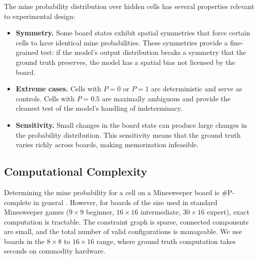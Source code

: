 \documentclass[12pt,a4paper]{article}
\begin{document}
The mine probability distribution over hidden cells has several properties relevant to experimental design:

\begin{itemize}[nosep]
    \item \textbf{Symmetry.} Some board states exhibit spatial symmetries that force certain cells to have identical mine probabilities. These symmetries provide a fine-grained test: if the model's output distribution breaks a symmetry that the ground truth preserves, the model has a spatial bias not licensed by the board.
    \item \textbf{Extreme cases.} Cells with $P = 0$ or $P = 1$ are deterministic and serve as controls. Cells with $P = 0.5$ are maximally ambiguous and provide the cleanest test of the model's handling of indeterminacy.
    \item \textbf{Sensitivity.} Small changes in the board state can produce large changes in the probability distribution. This sensitivity means that the ground truth varies richly across boards, making memorization infeasible.
\end{itemize}

\subsection{Computational Complexity}
\label{sec:complexity}

Determining the mine probability for a cell on a Minesweeper board is \#P-complete in general \citep{kaye2000}. However, for boards of the size used in standard Minesweeper games ($9 \times 9$ beginner, $16 \times 16$ intermediate, $30 \times 16$ expert), exact computation is tractable. The constraint graph is sparse, connected components are small, and the total number of valid configurations is manageable. We use boards in the $8 \times 8$ to $16 \times 16$ range, where ground truth computation takes seconds on commodity hardware.
\end{document}

